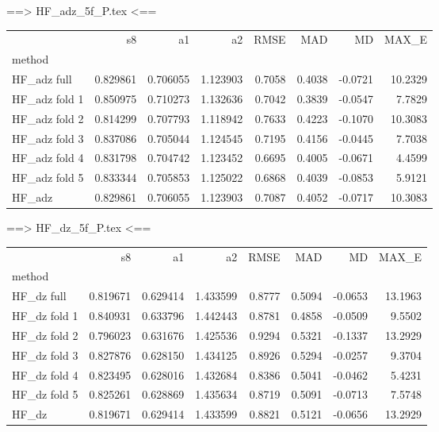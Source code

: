 ==> HF_adz_5f_P.tex <==
\begin{tabular}{lrrrrrrr}
 & s8 & a1 & a2 & RMSE & MAD & MD & MAX_E \\
method &  &  &  &  &  &  &  \\
HF_adz full & 0.829861 & 0.706055 & 1.123903 & 0.7058 & 0.4038 & -0.0721 & 10.2329 \\
HF_adz fold 1 & 0.850975 & 0.710273 & 1.132636 & 0.7042 & 0.3839 & -0.0547 & 7.7829 \\
HF_adz fold 2 & 0.814299 & 0.707793 & 1.118942 & 0.7633 & 0.4223 & -0.1070 & 10.3083 \\
HF_adz fold 3 & 0.837086 & 0.705044 & 1.124545 & 0.7195 & 0.4156 & -0.0445 & 7.7038 \\
HF_adz fold 4 & 0.831798 & 0.704742 & 1.123452 & 0.6695 & 0.4005 & -0.0671 & 4.4599 \\
HF_adz fold 5 & 0.833344 & 0.705853 & 1.125022 & 0.6868 & 0.4039 & -0.0853 & 5.9121 \\
HF_adz & 0.829861 & 0.706055 & 1.123903 & 0.7087 & 0.4052 & -0.0717 & 10.3083 \\
\end{tabular}

==> HF_dz_5f_P.tex <==
\begin{tabular}{lrrrrrrr}
 & s8 & a1 & a2 & RMSE & MAD & MD & MAX_E \\
method &  &  &  &  &  &  &  \\
HF_dz full & 0.819671 & 0.629414 & 1.433599 & 0.8777 & 0.5094 & -0.0653 & 13.1963 \\
HF_dz fold 1 & 0.840931 & 0.633796 & 1.442443 & 0.8781 & 0.4858 & -0.0509 & 9.5502 \\
HF_dz fold 2 & 0.796023 & 0.631676 & 1.425536 & 0.9294 & 0.5321 & -0.1337 & 13.2929 \\
HF_dz fold 3 & 0.827876 & 0.628150 & 1.434125 & 0.8926 & 0.5294 & -0.0257 & 9.3704 \\
HF_dz fold 4 & 0.823495 & 0.628016 & 1.432684 & 0.8386 & 0.5041 & -0.0462 & 5.4231 \\
HF_dz fold 5 & 0.825261 & 0.628869 & 1.435634 & 0.8719 & 0.5091 & -0.0713 & 7.5748 \\
HF_dz & 0.819671 & 0.629414 & 1.433599 & 0.8821 & 0.5121 & -0.0656 & 13.2929 \\
\end{tabular}

